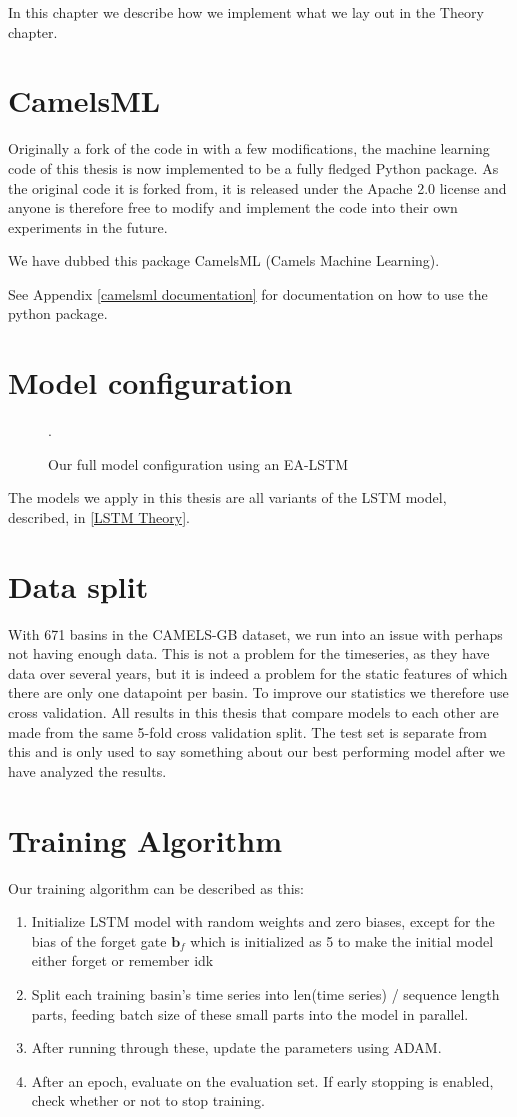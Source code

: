 In this chapter we describe how we implement what we lay out in the Theory chapter.
\section{CamelsML}
Originally a fork of the code in \cite{lstm_second_paper} with a few modifications, 
the machine learning code of this thesis is now implemented to be a fully fledged 
Python package. As the original code it is forked from, it is released under the 
Apache 2.0 license and anyone is therefore free to modify and implement the code 
into their own experiments in the future.

We have dubbed this package CamelsML (Camels Machine Learning).

See Appendix \ref{camelsml documentation} for documentation on how to use the python 
package.

\section{Model configuration}
\begin{figure}
\caption{Our full model configuration using an EA-LSTM \cite{lstm_second_paper}}.
\end{figure}
The models we apply in this thesis are all variants of the LSTM model, described, 
in \ref{LSTM Theory}.
\section{Data split}
With 671 basins in the CAMELS-GB dataset, we run into an issue with perhaps not 
having enough data. This is not a problem for the timeseries, as they have data 
over several years, but it is indeed a problem for the static features of which there 
are only one datapoint per basin. To improve our statistics we therefore use 
cross validation. All results in this thesis that compare models to each other 
are made from the same 5-fold cross validation split. The test set is separate 
from this and is only used to say something about our best performing model after 
we have analyzed the results.

\section{Training Algorithm}
Our training algorithm can be described as this:
\begin{enumerate}
    \item Initialize LSTM model with random weights and zero biases, except for the bias of the forget gate $\bm{b}_f$ which is initialized as 5 to make the initial model either forget or remember idk \citationneeded
    \item Split each training basin's time series into len(time series) / sequence length parts, feeding batch size of these small parts into the model in parallel. 
    \item After running through these, update the parameters using ADAM.
    \item After an epoch, evaluate on the evaluation set. If early stopping is enabled, check whether or not to stop training.
\end{enumerate}

